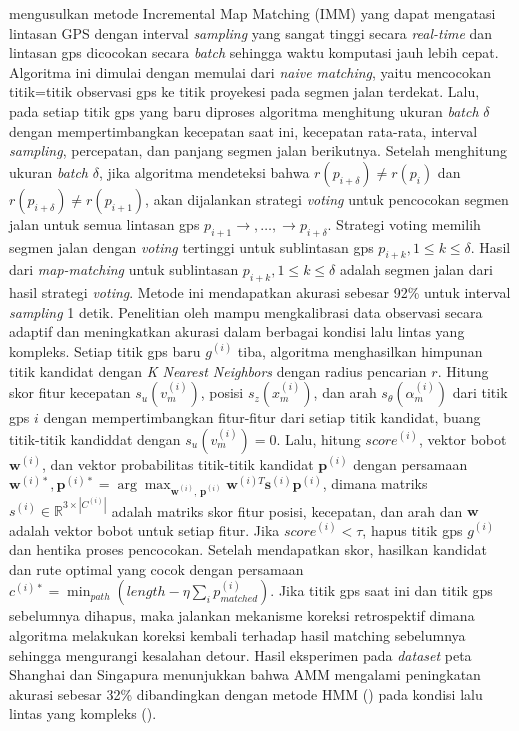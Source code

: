 \cite{Huang2022} mengusulkan metode Incremental Map Matching (IMM) yang dapat mengatasi lintasan GPS dengan interval \textit{sampling} yang sangat tinggi secara \textit{real-time} dan lintasan gps dicocokan secara \textit{batch} sehingga waktu komputasi jauh lebih cepat. Algoritma ini dimulai dengan memulai dari \textit{naive matching}, yaitu mencocokan titik=titik observasi gps ke titik proyekesi pada segmen jalan terdekat. Lalu, pada setiap titik gps yang baru diproses algoritma menghitung ukuran \textit{batch} $\delta$ dengan mempertimbangkan kecepatan saat ini, kecepatan rata-rata, interval \textit{sampling}, percepatan, dan panjang segmen jalan berikutnya. Setelah menghitung ukuran \textit{batch} $\delta$, jika algoritma mendeteksi bahwa $r(p_{i+\delta}) \neq r(p_i)$ dan $r(p_{i+\delta}) \neq r(p_{i+1})$, akan dijalankan strategi \textit{voting} untuk pencocokan segmen jalan untuk semua lintasan gps $p_{i+1}\rightarrow,\ldots,\rightarrow p_{i+\delta}$. Strategi voting memilih segmen jalan dengan \textit{voting} tertinggi untuk sublintasan gps $p_{i+k}, 1\leq k \leq \delta$. Hasil dari \textit{map-matching} untuk sublintasan $p_{i+k}, 1\leq k \leq \delta$ adalah segmen jalan dari hasil strategi \textit{voting}. Metode ini mendapatkan akurasi sebesar 92\% untuk interval \textit{sampling} 1 detik. Penelitian oleh \cite{Hu2023} mampu mengkalibrasi data observasi secara adaptif dan meningkatkan akurasi dalam berbagai kondisi lalu lintas yang kompleks. Setiap titik gps baru $g^{(i)}$ tiba, algoritma menghasilkan himpunan titik kandidat dengan \textit{K Nearest Neighbors} dengan radius pencarian $r$. Hitung skor fitur kecepatan $s_u(v_m^{(i)})$, posisi  $s_z(x_m^{(i)})$, dan arah $s_\theta(\alpha_m^{(i)})$ dari titik gps $i$ dengan mempertimbangkan fitur-fitur dari setiap titik kandidat, buang titik-titik kandiddat dengan $s_u(v_m^{(i)})=0$. Lalu, hitung $score^{(i)}$, vektor bobot $\mathbf{w}^{(i)}$, dan vektor probabilitas titik-titik kandidat $\mathbf{p}^{(i)}$ dengan persamaan $\mathbf{w}^{(i)*},\mathbf{p}^{(i)*}=\arg\max_{\mathbf{w}^{(i)},\, \mathbf{p}^{(i)}} \mathbf{w}^{(i)T} \mathbf{s}^{(i)} \mathbf{p}^{(i)}$, dimana matriks $s^{(i)} \in \mathbb{R}^{3\times |C^{(i)}|}$ adalah matriks skor fitur posisi, kecepatan, dan arah dan $\mathbf{w}$ adalah vektor bobot untuk setiap fitur. Jika $score^{(i)} < \tau$, hapus titik gps $g^{(i)}$ dan hentika proses pencocokan. Setelah mendapatkan skor, hasilkan kandidat dan rute optimal yang cocok dengan persamaan $c^{(i)*}=\min_{path}(length-\eta\sum_i p_{matched}^{(i)})$. Jika titik gps saat ini dan titik gps sebelumnya dihapus, maka jalankan mekanisme koreksi retrospektif dimana algoritma melakukan koreksi kembali terhadap hasil matching sebelumnya sehingga mengurangi kesalahan detour. Hasil eksperimen pada \textit{dataset} peta Shanghai dan Singapura menunjukkan bahwa AMM mengalami peningkatan akurasi sebesar 32\% dibandingkan dengan metode HMM (\cite{Krumm2009}) pada kondisi lalu lintas yang kompleks (\cite{Hu2023}).

